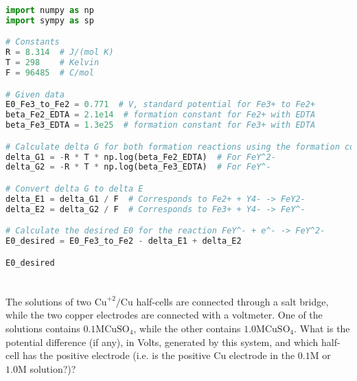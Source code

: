 \documentclass[12pt]{article}
\begin{document}
\begin{lstlisting}[language=Python]
import numpy as np
import sympy as sp

# Constants
R = 8.314  # J/(mol K)
T = 298    # Kelvin
F = 96485  # C/mol

# Given data
E0_Fe3_to_Fe2 = 0.771  # V, standard potential for Fe3+ to Fe2+
beta_Fe2_EDTA = 2.1e14  # formation constant for Fe2+ with EDTA
beta_Fe3_EDTA = 1.3e25  # formation constant for Fe3+ with EDTA

# Calculate delta G for both formation reactions using the formation constants
delta_G1 = -R * T * np.log(beta_Fe2_EDTA)  # For FeY^2-
delta_G2 = -R * T * np.log(beta_Fe3_EDTA)  # For FeY^-

# Convert delta G to delta E
delta_E1 = delta_G1 / F  # Corresponds to Fe2+ + Y4- -> FeY2-
delta_E2 = delta_G2 / F  # Corresponds to Fe3+ + Y4- -> FeY^-

# Calculate the desired E0 for the reaction FeY^- + e^- -> FeY^2-
E0_desired = E0_Fe3_to_Fe2 - delta_E1 + delta_E2

E0_desired

\end{lstlisting}
\section{}
The solutions of two $\mathrm{Cu}^{+2} / \mathrm{Cu}$ half-cells are connected through a salt bridge, while the two copper electrodes are connected with a voltmeter. One of the solutions contains $0.1 \mathrm{M} \mathrm{CuSO}_{4}$, while the other contains $1.0 \mathrm{M} \mathrm{CuSO}_{4}$. What is the potential difference (if any), in Volts, generated by this system, and which half-cell has the positive electrode (i.e. is the positive $\mathrm{Cu}$ electrode in the $0.1 \mathrm{M}$ or $1.0 \mathrm{M}$ solution?)?
\end{document}
